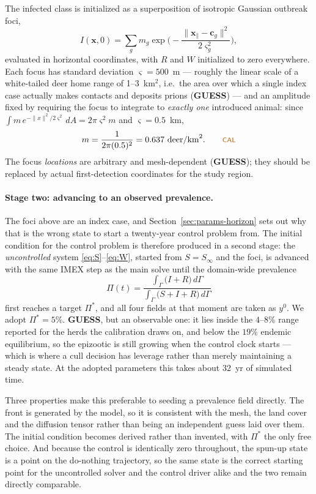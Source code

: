 \documentclass[11pt]{article}
\newcommand{\tagCAL}{{\footnotesize\textsf{\textcolor{orange!75!black}{CAL}}}}
\newcommand{\tagGUESS}{{\footnotesize\textsf{\textbf{\textcolor{red!70!black}{GUESS}}}}}
\begin{document}
The infected class is initialized as a superposition of isotropic Gaussian outbreak foci,
\[
I(\mathbf{x},0) = \sum_{g} m_g \exp\!\Big(-\frac{\lVert \mathbf{x}_{\parallel}-\mathbf{c}_g\rVert^2}{2\varsigma_g^2}\Big),
\]
evaluated in horizontal coordinates, with $R$ and $W$ initialized to zero everywhere. Each focus has standard deviation $\varsigma = 500$~m --- roughly the linear scale of a white-tailed deer home range of 1--3~km$^2$, i.e.\ the area over which a single index case actually makes contacts and deposits prions (\tagGUESS{}) --- and an amplitude fixed by requiring the focus to integrate to \emph{exactly one} introduced animal: since $\int m\,e^{-\lVert x\rVert^2/2\varsigma^2}\,dA = 2\pi\varsigma^2 m$ and $\varsigma = 0.5$~km,
\[
m = \frac{1}{2\pi(0.5)^2} = 0.637\ \text{deer/km}^2. \qquad \tagCAL{}
\]
The focus \emph{locations} are arbitrary and mesh-dependent (\tagGUESS{}); they should be replaced by actual first-detection coordinates for the study region.

\paragraph{Stage two: advancing to an observed prevalence.} The foci above are an index case, and Section~\ref{sec:params-horizon} sets out why that is the wrong state to start a twenty-year control problem from. The initial condition for the control problem is therefore produced in a second stage: the \emph{uncontrolled} system \eqref{eq:S}--\eqref{eq:W}, started from $S = S_\infty$ and the foci, is advanced with the same IMEX step as the main solve until the domain-wide prevalence
\begin{equation}
\Pi(t) = \frac{\int_\Gamma \big(I + R\big)\,d\Gamma}{\int_\Gamma \big(S + I + R\big)\,d\Gamma}
\label{eq:prevalence}
\end{equation}
first reaches a target $\Pi^\ast$, and all four fields at that moment are taken as $y^0$. We adopt $\Pi^\ast = 5\%$. \tagGUESS{}, but an observable one: it lies inside the $4$--$8\%$ range reported for the herds the calibration draws on, and below the $19\%$ endemic equilibrium, so the epizootic is still growing when the control clock starts --- which is where a cull decision has leverage rather than merely maintaining a steady state. At the adopted parameters this takes about $32$~yr of simulated time.

Three properties make this preferable to seeding a prevalence field directly. The front is generated by the model, so it is consistent with the mesh, the land cover and the diffusion tensor rather than being an independent guess laid over them. The initial condition becomes derived rather than invented, with $\Pi^\ast$ the only free choice. And because the control is identically zero throughout, the spun-up state is a point on the do-nothing trajectory, so the same state is the correct starting point for the uncontrolled solver and the control driver alike and the two remain directly comparable.
\end{document}
